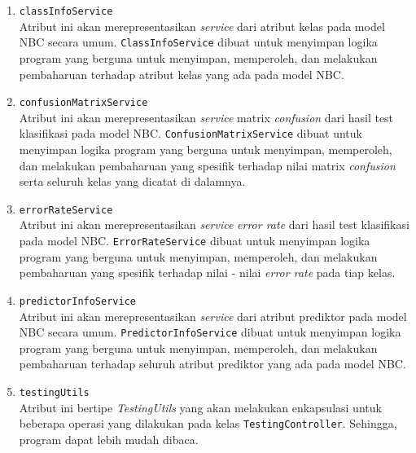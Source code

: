 \begin{enumerate}
\begin{enumerate}
			\item \texttt{classInfoService}\\
			Atribut ini akan merepresentasikan \textit{service} dari atribut kelas pada model NBC secara umum. \texttt{ClassInfoService} dibuat untuk menyimpan logika program yang berguna untuk menyimpan, memperoleh, dan melakukan pembaharuan terhadap atribut kelas yang ada pada model NBC.

			\item \texttt{confusionMatrixService}\\
			Atribut ini akan merepresentasikan \textit{service} matrix \textit{confusion} dari hasil test klasifikasi pada model NBC. \texttt{ConfusionMatrixService} dibuat untuk menyimpan logika program yang berguna untuk menyimpan, memperoleh, dan melakukan pembaharuan yang spesifik terhadap nilai matrix \textit{confusion} serta seluruh kelas yang dicatat di dalamnya.

			\item \texttt{errorRateService}\\
			Atribut ini akan merepresentasikan \textit{service} \textit{error rate} dari hasil test klasifikasi pada model NBC. \texttt{ErrorRateService} dibuat untuk menyimpan logika program yang berguna untuk menyimpan, memperoleh, dan melakukan pembaharuan yang spesifik terhadap nilai - nilai \textit{error rate} pada tiap kelas.

			\item \texttt{predictorInfoService}\\
			Atribut ini akan merepresentasikan \textit{service} dari atribut prediktor pada model NBC secara umum. \texttt{PredictorInfoService} dibuat untuk menyimpan logika program yang berguna untuk menyimpan, memperoleh, dan melakukan pembaharuan terhadap seluruh atribut prediktor yang ada pada model NBC.

			\item \texttt{testingUtils}\\
			Atribut ini bertipe \textit{TestingUtils} yang akan melakukan enkapsulasi untuk beberapa operasi yang dilakukan pada kelas \texttt{TestingController}. Sehingga, program dapat lebih mudah dibaca.

		\end{enumerate}
		

\end{enumerate}
